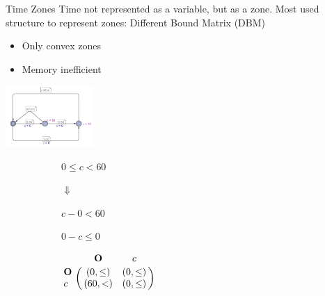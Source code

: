 \begin{frame}{Time Zones}
Time not represented as a variable, but as a zone. Most used structure to represent zones: Different Bound Matrix (DBM)
\begin{itemize}
	\item Only convex zones
	\item Memory inefficient
\end{itemize}
\begin{center}
\includegraphics[width=0.25\textwidth]{img/TA}
\end{center}
\begin{figure}
\centering
	\begin{subfigure}{0.3\textwidth}
	\centering
		$0 \leq c < 60$
		
		$\Downarrow$		
		
		$c - 0 < 60$
		
		$0 - c \leq 0 $
	\end{subfigure}
	\begin{subfigure}{0.3\textwidth}
	\begin{math}
 \bordermatrix{ 	   & \mathbf{O}    & c         \cr
 			\mathbf{O} &(0,\leq)       & (0,\leq)  \cr
 			c          &(60,<   )      & (0,\leq)  \cr}
	\end{math}
	\end{subfigure}
\end{figure}
\end{frame}

